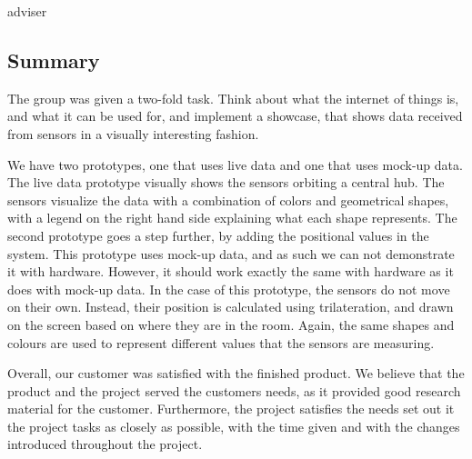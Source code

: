 adviser\documentclass[../document]{subfiles}
\begin{document}
\subsection{Summary}
The group was given a two-fold task. Think about what the internet of things is, and what it can be used for, and implement a showcase, that shows data received from sensors in a visually interesting fashion.

We have two prototypes, one that uses live data and one that uses mock-up data. The live data prototype visually shows the sensors orbiting a central hub. The sensors visualize the data with a combination of colors and geometrical shapes, with a legend on the right hand side explaining what each shape represents. The second prototype goes a step further, by adding the positional values in the system. This prototype uses mock-up data, and as such we can not demonstrate it with hardware. However, it should work exactly the same with hardware as it does with mock-up data. In the case of this prototype, the sensors do not move on their own. Instead, their position is calculated using trilateration, and drawn on the screen based on where they are in the room. Again, the same shapes and colours are used to represent different values that the sensors are measuring.

Overall, our customer was satisfied with the finished product. We believe that the product and the project served the customers needs, as it provided good research material for the customer. Furthermore, the project satisfies the needs set out it the project tasks as closely as possible, with the time given and with the changes introduced throughout the project.
\end{document}
